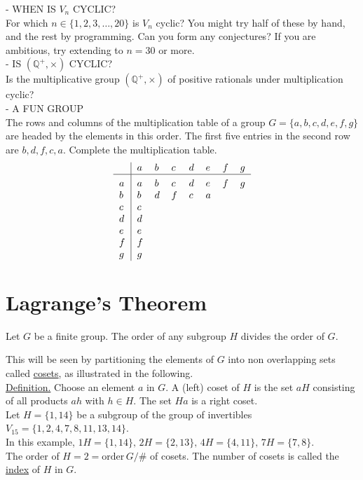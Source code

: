\documentclass[12pt]{book}
\theoremstyle{definition}
\begin{document}
 - WHEN IS $ V_n $ CYCLIC? \\[.2in]
For which $ n\in\{1,2,3,\dots, 20\} $ is $ V_n $ cyclic? You might try half of these by hand, and the rest by programming. Can you form any conjectures? If you are ambitious, try extending to $ n=30 $ or more. \\[.2in]


 - IS $ (\mathbb{Q}^+,\times) $ CYCLIC? \\[.2in]
Is the multiplicative group  $ (\mathbb{Q}^+, \times) $ of positive rationals under multiplication cyclic?\\[.2in] 

 - A FUN GROUP \\[.2in]
The rows and columns of the multiplication table of a group $ G=\{a,b,c,d,e,f,g\} $ are headed by the elements in this order. The first five entries in the second row are $ b,d,f,c,a $. Complete the multiplication table.
\[
\begin{tabular}{>{$}l<{$}|*{7}{>{$}l<{$}}}
~  & a  & b   & c & d   & e & f & g \\
\hline\vrule height 12pt width 0pt
a   & a   & b   & c   & d   & e  & f & g \\
b   & b   & d   & f   & c   & a   & & \\
c   & c   &     &     &     &    &  & \\
d   & d   &    &     &     &    &  &  \\
e   & e   &     &     &     &    &  & \\
f   & f   &     &     &     &    &  & \\
g   &  g   &     &     &     &    &  & \\

\end{tabular} 
\]


\section{Lagrange's Theorem}
\begin{tctheorem}{}{}
Let $G$ be a finite group.  The order of any subgroup $H$ divides the order of $G$.
\end{tctheorem}
%
This will be seen by partitioning the elements of $G$ into non overlapping sets called \underline{cosets}, as illustrated in the following.\\[.2in]
\underline{Definition.} Choose an element $a$ in $G$.  A (left) coset of $H$ is the set $aH$ consisting of all products $ah$ with $h\in H$. The set $ Ha $ is a right coset.\\[.2in]
Let $H=\{1,14\}$ be a subgroup of the group of invertibles $V_{15}=\{1,2,4,7,8,11,13,14\}$.\\
In this example, $1H=\{1,14\},\,2H=\{2,13\},\,4H=\{4,11\},\,7H=\{7,8\}$.\\
The order of $H=2=\text{order} \, G/$\# of cosets.  The number of cosets is called the \underline{index} of $H$ in $G$.
\end{document}
